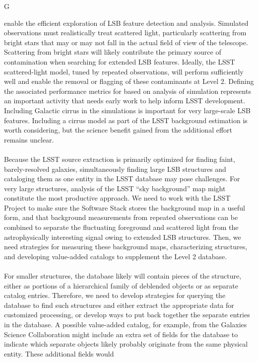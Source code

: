 {\begin{tasklist}{G}
\begin{task}
{enable the efficient exploration of LSB feature detection and analysis.
Simulated observations must realistically treat scattered light, particularly
scattering from bright stars that may or may not fall in the actual field of
view of the telescope. Scattering from bright stars will likely contribute the
primary source of contamination when searching for extended LSB features.
Ideally, the LSST scattered-light model,
tuned by repeated observations, will perform sufficiently well and enable the removal
or flagging of these contaminants at Level 2.  
Defining the associated performance metrics for
based on analysis of simulation represents an important activity that needs early work to 
help inform LSST development. Including Galactic cirrus in the simulations is important
for very large-scale LSB features. Including a cirrus model as part of the LSST background
estimation is worth considering, but the science benefit gained from the
additional effort remains unclear.\\
~\\
Because the LSST source extraction is primarily
optimized for finding faint, barely-resolved galaxies,
simultaneously finding large LSB structures and cataloging them as 
one entity in the LSST database may pose challenges. 
For very large structures, analysis of the LSST ``sky background''
map might constitute the most productive approach. 
We need to work with the LSST Project
to make sure the Software Stack stores the background map in a useful form, and that background
measurements from repeated observations can be combined to separate the fluctuating
foreground and scattered light from the astrophysically interesting signal owing to extended
LSB structures.
Then, we need strategies for measuring these background maps, characterizing
structures, and developing value-added catalogs to supplement the Level 2 database.\\
~\\
For smaller structures, the database likely will contain pieces 
of the structure, either as portions of a hierarchical
family of deblended objects or as separate catalog entries. Therefore, we need to 
develop strategies for querying the database to find such structures and either extract
the appropriate data for customized processing, or develop ways to put back together
the separate entries in the database. A possible value-added catalog, for example, from
the Galaxies Science Collaboration might include an extra set of fields for the database to indicate 
which separate objects likely probably originate from the same physical entity. These additional fields would
}
\end{task}
\end{tasklist}}
